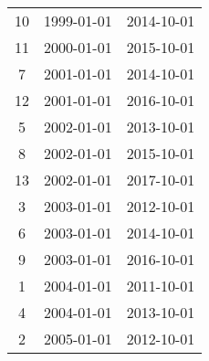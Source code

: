 % 
\begin{tabular}{ccc}
  \hline
  \hline
10 & 1999-01-01 & 2014-10-01 \\ 
  11 & 2000-01-01 & 2015-10-01 \\ 
  7 & 2001-01-01 & 2014-10-01 \\ 
  12 & 2001-01-01 & 2016-10-01 \\ 
  5 & 2002-01-01 & 2013-10-01 \\ 
  8 & 2002-01-01 & 2015-10-01 \\ 
  13 & 2002-01-01 & 2017-10-01 \\ 
  3 & 2003-01-01 & 2012-10-01 \\ 
  6 & 2003-01-01 & 2014-10-01 \\ 
  9 & 2003-01-01 & 2016-10-01 \\ 
  1 & 2004-01-01 & 2011-10-01 \\ 
  4 & 2004-01-01 & 2013-10-01 \\ 
  2 & 2005-01-01 & 2012-10-01 \\ 
   \hline
\end{tabular}
